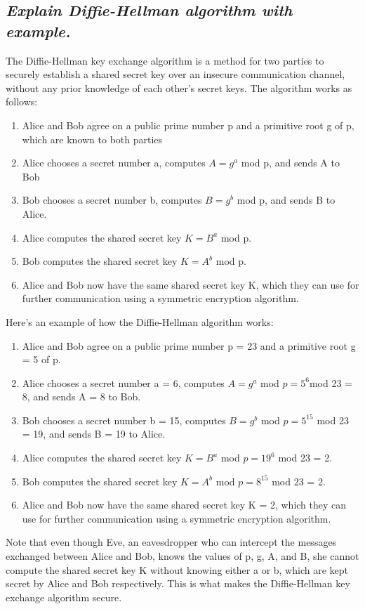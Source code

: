\documentclass{article}
\begin{document}
\subsection{\textit{Explain Diffie-Hellman algorithm with example.}}
The Diffie-Hellman key exchange algorithm is a method for two parties to securely establish a shared secret key over an insecure communication channel, without any prior knowledge of each other's secret keys. The algorithm works as follows:
\begin{enumerate}
    \item Alice and Bob agree on a public prime number p and a primitive root g of p, which are known to both parties
    \item Alice chooses a secret number a, computes $A = g^{a}$ mod p, and sends A to Bob
    \item Bob chooses a secret number b, computes $B = g^{b}$ mod p, and sends B to Alice.
    \item Alice computes the shared secret key $K = B^{a}$ mod p.
    \item Bob computes the shared secret key $K = A^b$ mod p.
    \item Alice and Bob now have the same shared secret key K, which they can use for further communication using a symmetric encryption algorithm.
\end{enumerate}
Here's an example of how the Diffie-Hellman algorithm works:
\begin{enumerate}
    \item Alice and Bob agree on a public prime number p = 23 and a primitive root g = 5 of p.
    \item Alice chooses a secret number a = 6, computes $A = g^a$ mod $p = 5^{6} $mod 23 = 8, and sends A = 8 to Bob.
    \item Bob chooses a secret number b = 15, computes $B = g^b$ mod $p = 5^{15} $ mod 23 = 19, and sends B = 19 to Alice.
    \item Alice computes the shared secret key $K = B^a$ mod $p = 19^{6}$ mod 23 = 2.
    \item Bob computes the shared secret key $K = A^b$ mod $p = 8^{15}$ mod 23 = 2.
    \item Alice and Bob now have the same shared secret key K = 2, which they can use for further communication using a symmetric encryption algorithm.
\end{enumerate}
Note that even though Eve, an eavesdropper who can intercept the messages exchanged between Alice and Bob, knows the values of p, g, A, and B, she cannot compute the shared secret key K without knowing either a or b, which are kept secret by Alice and Bob respectively. This is what makes the Diffie-Hellman key exchange algorithm secure.
\end{document}
